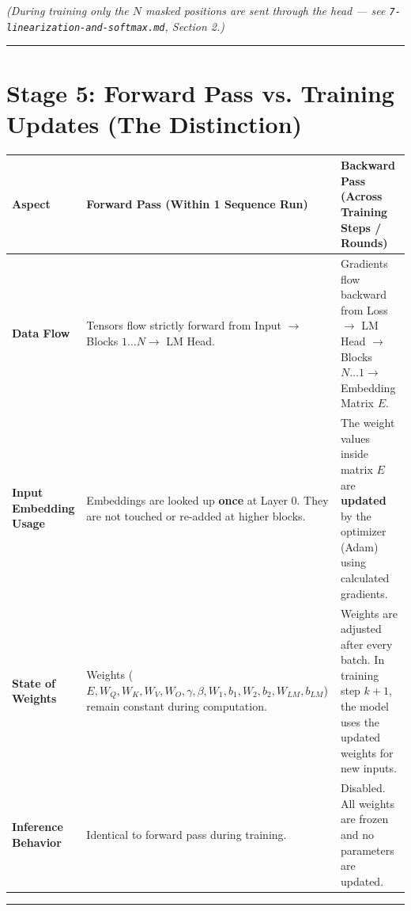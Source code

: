 \documentclass[11pt,a4paper,oneside]{report}
\begin{document}
\emph{(During training only the \(N\) masked positions are sent through the head --- see \texttt{7-linearization-and-softmax.\allowbreak{}md}, Section 2.)}

\begin{center}\rule{0.5\linewidth}{0.5pt}\end{center}

\section{Stage 5: Forward Pass vs. Training Updates (The Distinction)}\label{stage-5-forward-pass-vs-training-updates-the-distinction}

{\def\LTcaptype{none} %
\begin{longtable}[]{@{}>{\raggedright\arraybackslash}p{}>{\raggedright\arraybackslash}p{}>{\raggedright\arraybackslash}p{}@{}}
\toprule\noalign{}
Aspect & Forward Pass (Within 1 Sequence Run) & Backward Pass (Across Training Steps / Rounds) \\
\midrule\noalign{}
\endhead
\bottomrule\noalign{}
\endlastfoot
\textbf{Data Flow} & Tensors flow strictly forward from Input \(\rightarrow\) Blocks \(1\dots N \rightarrow\) LM Head. & Gradients flow backward from Loss \(\rightarrow\) LM Head \(\rightarrow\) Blocks \(N\dots 1 \rightarrow\) Embedding Matrix \(E\). \\
\textbf{Input Embedding Usage} & Embeddings are looked up \textbf{once} at Layer 0. They are not touched or re-added at higher blocks. & The weight values inside matrix \(E\) are \textbf{updated} by the optimizer (Adam) using calculated gradients. \\
\textbf{State of Weights} & Weights (\(E,\allowbreak W_Q,\allowbreak W_K,\allowbreak W_V,\allowbreak W_O,\allowbreak \gamma,\allowbreak \beta,\allowbreak W_1,\allowbreak b_1,\allowbreak W_2,\allowbreak b_2,\allowbreak W_{LM},\allowbreak b_{LM}\)) remain constant during computation. & Weights are adjusted after every batch. In training step \(k+1\), the model uses the updated weights for new inputs. \\
\textbf{Inference Behavior} & Identical to forward pass during training. & Disabled. All weights are frozen and no parameters are updated. \\
\end{longtable}
}

\begin{center}\rule{0.5\linewidth}{0.5pt}\end{center}
\end{document}
